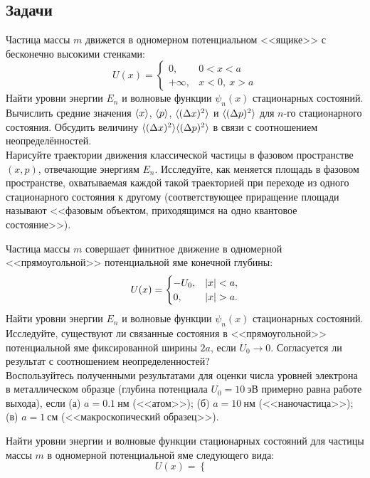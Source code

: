 \subsection*{\hfil Задачи \hfil}

\begin{problem}
\item\label{p:1_1_1}%
Частица массы $m$ движется в одномерном потенциальном <<ящике>> с бесконечно высокими стенками:
$$
U(x) = \begin{cases}
0, & 0 < x < a\\
+\infty, & x < 0,~ x > a
\end{cases}
$$%
%
Найти уровни энергии $E_n$ и волновые функции $\psi_n(x)$ стационарных состояний. Вычислить средние значения $\avg{x}$, $\avg{p}$, $\avg{(\Delta x)^2}$ и $\avg{(\Delta p)^2}$ для $n$-го стационарного состояния. Обсудить величину $\avg{(\Delta x)^2}\avg{(\Delta p)^2}$ в связи с соотношением неопределённостей.\\
Нарисуйте траектории движения классической частицы в фазовом пространстве $(x, p)$, отвечающие энергиям $E_n$. Исследуйте, как меняется площадь в фазовом пространстве, охватываемая каждой такой траекторией при переходе из одного стационарного состояния к другому (соответствующее приращение площади называют <<фазовым объектом, приходящимся на одно квантовое состояние>>).
%
\item\label{p:1_1_2}%
Частица массы $m$ совершает финитное движение в одномерной <<прямоугольной>> потенциальной яме конечной глубины:
$$
U(x) =
\begin{cases}
-U_0, & \abs{x} < a,\\
0, & \abs{x} > a.
\end{cases}
$$%
%
Найти уровни энергии $E_n$ и волновые функции $\psi_n(x)$ стационарных состояний. Исследуйте, существуют ли связанные состояния в <<прямоугольной>> потенциальной яме фиксированной ширины $2a$, если $U_0 \to 0$. Согласуется ли результат с соотношением неопределенностей?\\
%
Воспользуйтесь полученными результатами для оценки числа уровней электрона в металлическом образце (глубина потенциала $U_0 = 10~\text{эВ}$ примерно равна работе выхода), если (а) $a = 0.1~\text{нм}$ (<<атом>>); (б) $a = 10~\text{нм}$ (<<наночастица>>); (в) $a = 1~\text{см}$ (<<макроскопический образец>>).
%
\item\label{p:1_1_3}%
Найти уровни энергии и волновые функции стационарных состояний для частицы массы $m$ в одномерной потенциальной яме следующего вида:
$$
U(x) =
\begin{cases}

\end{cases}$$
\end{problem}
